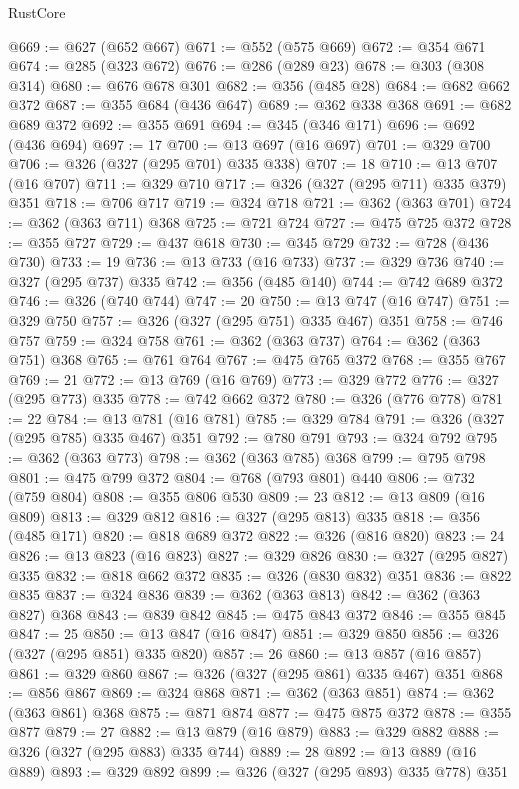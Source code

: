 \begin{lexlean}{RustCore}
\begin{coremodule}
@669 := @627 (@652 @667)
@671 := @552 (@575 @669)
@672 := @354 @671
@674 := @285 (@323 @672)
@676 := @286 (@289 @23)
@678 := @303 (@308 @314)
@680 := @676 @678 @301
@682 := @356 (@485 @28)
@684 := @682 @662 @372
@687 := @355 @684 (@436 @647)
@689 := @362 @338 @368
@691 := @682 @689 @372
@692 := @355 @691
@694 := @345 (@346 @171)
@696 := @692 (@436 @694)
@697 := 17
@700 := @13 @697 (@16 @697)
@701 := @329 @700
@706 := @326 (@327 (@295 @701) @335 @338)
@707 := 18
@710 := @13 @707 (@16 @707)
@711 := @329 @710
@717 := @326 (@327 (@295 @711) @335 @379) @351
@718 := @706 @717
@719 := @324 @718
@721 := @362 (@363 @701)
@724 := @362 (@363 @711) @368
@725 := @721 @724
@727 := @475 @725 @372
@728 := @355 @727
@729 := @437 @618
@730 := @345 @729
@732 := @728 (@436 @730)
@733 := 19
@736 := @13 @733 (@16 @733)
@737 := @329 @736
@740 := @327 (@295 @737) @335
@742 := @356 (@485 @140)
@744 := @742 @689 @372
@746 := @326 (@740 @744)
@747 := 20
@750 := @13 @747 (@16 @747)
@751 := @329 @750
@757 := @326 (@327 (@295 @751) @335 @467) @351
@758 := @746 @757
@759 := @324 @758
@761 := @362 (@363 @737)
@764 := @362 (@363 @751) @368
@765 := @761 @764
@767 := @475 @765 @372
@768 := @355 @767
@769 := 21
@772 := @13 @769 (@16 @769)
@773 := @329 @772
@776 := @327 (@295 @773) @335
@778 := @742 @662 @372
@780 := @326 (@776 @778)
@781 := 22
@784 := @13 @781 (@16 @781)
@785 := @329 @784
@791 := @326 (@327 (@295 @785) @335 @467) @351
@792 := @780 @791
@793 := @324 @792
@795 := @362 (@363 @773)
@798 := @362 (@363 @785) @368
@799 := @795 @798
@801 := @475 @799 @372
@804 := @768 (@793 @801) @440
@806 := @732 (@759 @804)
@808 := @355 @806 @530
@809 := 23
@812 := @13 @809 (@16 @809)
@813 := @329 @812
@816 := @327 (@295 @813) @335
@818 := @356 (@485 @171)
@820 := @818 @689 @372
@822 := @326 (@816 @820)
@823 := 24
@826 := @13 @823 (@16 @823)
@827 := @329 @826
@830 := @327 (@295 @827) @335
@832 := @818 @662 @372
@835 := @326 (@830 @832) @351
@836 := @822 @835
@837 := @324 @836
@839 := @362 (@363 @813)
@842 := @362 (@363 @827) @368
@843 := @839 @842
@845 := @475 @843 @372
@846 := @355 @845
@847 := 25
@850 := @13 @847 (@16 @847)
@851 := @329 @850
@856 := @326 (@327 (@295 @851) @335 @820)
@857 := 26
@860 := @13 @857 (@16 @857)
@861 := @329 @860
@867 := @326 (@327 (@295 @861) @335 @467) @351
@868 := @856 @867
@869 := @324 @868
@871 := @362 (@363 @851)
@874 := @362 (@363 @861) @368
@875 := @871 @874
@877 := @475 @875 @372
@878 := @355 @877
@879 := 27
@882 := @13 @879 (@16 @879)
@883 := @329 @882
@888 := @326 (@327 (@295 @883) @335 @744)
@889 := 28
@892 := @13 @889 (@16 @889)
@893 := @329 @892
@899 := @326 (@327 (@295 @893) @335 @778) @351

\end{coremodule}
\end{lexlean}
